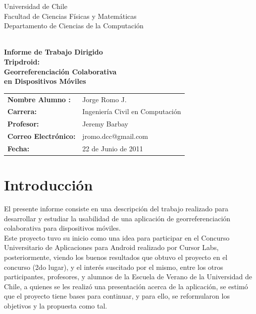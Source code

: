 \documentclass[10pt,letterpaper]{article}
\begin{document}
\begin{titlepage}
\begin{minipage}{12cm} Universidad de Chile
\\ Facultad de Ciencias F\'isicas y Matem\'aticas
\\ Departamento de Ciencias de la Computaci\'on\\
\\
\end{minipage}
\vspace*{2cm}
\begin{center}
\vspace{0.2cm}
{\Large \bf\vspace{0.5cm} Informe de Trabajo Dirigido}\\
{\Huge\bf\vspace{0.3cm} Tripdroid:}\\
{\Huge\bf\vspace{0.3cm} Georreferenciación Colaborativa}\\
{\Huge\bf\vspace{0.2cm} en Dispositivos Móviles}\\

\end{center}
\vspace{4cm}
\begin{tabular}{ll}
\bf{Nombre Alumno :}& Jorge Romo J. \\
\bf{Carrera:} & Ingeniería Civil en Computación\\ 
\bf{Profesor:} & Jeremy Barbay  \\ 
\bf{Correo Electrónico:} & jromo.dcc@gmail.com  \\ 
\bf{Fecha:} & 22 de Junio de 2011  \\ 
\end{tabular}
\end{titlepage}
\newpage
\tableofcontents
\setcounter{tocdepth}{1}

\newpage
\section{Introducción}

El presente informe consiste en una descripción del trabajo realizado para desarrollar y estudiar la usabilidad de una aplicación de georreferenciación colaborativa para dispositivos móviles.\\

Este proyecto tuvo su inicio como una idea para participar en el Concurso Universitario de Aplicaciones para Android realizado por Cursor Labs, posteriormente, viendo los buenos resultados que obtuvo el proyecto en el concurso (2do lugar), y el interés suscitado por el mismo, entre los otros participantes, profesores, y alumnos de la Escuela de Verano de la Universidad de Chile, a quienes se les realizó una presentación acerca de la aplicación, se estimó que el proyecto tiene bases para continuar, y para ello, se reformularon los objetivos y la propuesta como tal.\\
\end{document}
